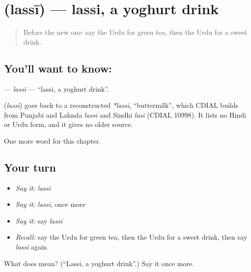 \section[\texorpdfstring{\ur{لسی} (lassī)}{لسی (lassī)}]{ (lassī) — lassi, a yoghurt drink}

\label{lesson:UR-C118-lassi}



\begin{quote}
Before the new one: say the Urdu for green tea, then the Urdu for a sweet drink.
\end{quote}

\subsection*{You'll want to know: }
\textbf{} — \emph{lassī} — \textquotedblleft{}lassi, a yoghurt drink\textquotedblright{}.

\begin{cousinweb}
\textbf{} (\emph{lassī}) goes back to a reconstructed \emph{*lassī}, \textquotedblleft{}buttermilk\textquotedblright{}, which CDIAL builds from Punjabi and Lahnda \emph{lassī} and Sindhi \emph{lasī} (CDIAL 10998). It lists no Hindi or Urdu form, and it gives no older source.
\end{cousinweb}

\begin{grammarlens}[title={What you've built}]
One more word for this chapter.
\end{grammarlens}

\subsection*{Your turn}
\begin{itemize}
\raggedright
  \item \emph{Say it:} \emph{lassī}
  \item \emph{Say it:} \emph{lassī}, once more
  \item \emph{Say it:} say \emph{lassī}
  \item \emph{Recall:} say the Urdu for green tea, then the Urdu for a sweet drink, then say \emph{lassī} again
\end{itemize}

\begin{tcolorbox}[breakable,colback=teal!4,colframe=teal!35!black,title={Before you move on}]
What does  mean? (\textquotedblleft{}Lassi, a yoghurt drink\textquotedblright{}.) Say it once more.
\end{tcolorbox}
